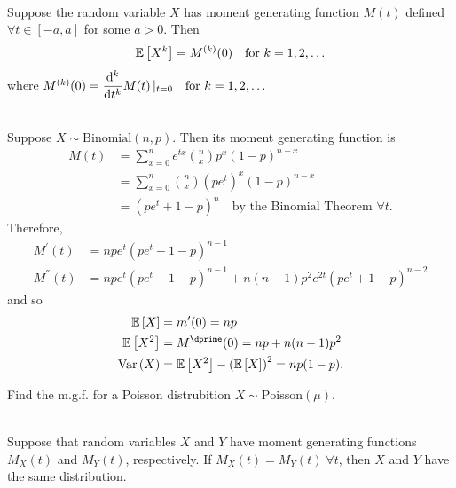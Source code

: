 \begin{theorem}
    \phantom{}\\
    Suppose the random variable $X$ has moment generating function $M(t)$ defined $\forall t \in [-a,a]$ for some $a > 0$. Then \vspace{-3mm}
    \[
        \mathbb{E}\left[{X^k}\right] = M^{(k)}(0) \quad \text{for $k = 1,2,\ldots$}
    \]
    where $M^{(k)}(0) = \displaystyle \frac{\dd^k}{\dd{t^k}} M(t) \, |_{t=0} \quad \text{for } k = 1, 2, \ldots$
\end{theorem}

\pagebreak

\begin{example}
    \phantom{}\\
    Suppose $X \sim \text{Binomial}(n,p)$. Then its moment generating function is
    \begin{align*}
        M(t) &= \displaystyle \sum_{x=0}^{n} e^{tx} \binom{n}{x} p^x (1-p)^{n-x} \\
        &= \displaystyle \sum_{x=0}^{n} \binom{n}{x} (p e^t)^x (1-p)^{n-x} \\
        &=(pe^t + 1 - p)^n \quad \text{by the Binomial Theorem $\forall t$.}
    \end{align*}
    Therefore, \vspace{-3mm}
    \begin{align*}
        M^\prime(t) &= npe^t \left(pe^t + 1 - p\right)^{n-1} \\
        M^\dprime(t) &= npe^t \left(pe^t + 1 - p\right)^{n-1} + n(n-1)p^2 e^{2t} \left(pe^t + 1 - p\right)^{n-2}
    \end{align*}
    and so
    \begin{align*}
        \expect{X} &= m^\prime(0) = np \\
        \expect{X^2} &= M^\dprime(0) = np + n(n-1)p^2 \\
        \Var{X} &= \expect{X^2} - \left( \expect{X} \right)^2 = np(1-p).
    \end{align*}
\end{example}

\begin{example}[exercise]
    Find the m.g.f. for a Poisson distrubition $X \sim \text{Poisson}(\mu)$. \\
\end{example}

\begin{theorem}
    \phantom{}\\
    Suppose that random variables $X$ and $Y$ have moment generating functions $M_X(t)$ and $M_Y(t)$, respectively. If $M_X(t) = M_Y(t) \; \forall t$, then $X$ and $Y$ have the same distribution.
\end{theorem}

